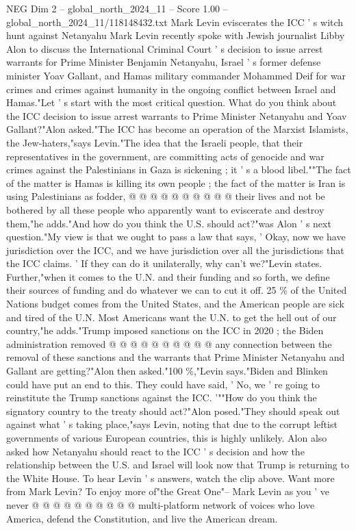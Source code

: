 \begin{textsample}{NEG Dim 2 – global\_north\_2024\_11 – Score 1.00 – global\_north\_2024\_11/118148432.txt}  \label{ex:f2_neg_095}
Mark Levin eviscerates the ICC ' s witch hunt against Netanyahu Mark Levin recently spoke with Jewish journalist Libby Alon to discuss the International Criminal Court ' s decision to issue arrest warrants for Prime Minister Benjamin Netanyahu, Israel ' s former defense minister Yoav Gallant, and Hamas military commander Mohammed Deif for war crimes and crimes against humanity in the ongoing conflict between Israel and Hamas."Let ' s start with the most critical question.
What do you think about the ICC decision to issue arrest warrants to Prime Minister Netanyahu and Yoav Gallant?"Alon asked."The ICC has become an operation of the Marxist Islamists, the Jew-haters,"says Levin."The idea that the Israeli people, that their representatives in the government, are committing acts of genocide and war crimes against the Palestinians in Gaza is sickening ; it ' s a blood libel.""The fact of the matter is Hamas is killing its own people ; the fact of the matter is Iran is using Palestinians as fodder, @ @ @ @ @ @ @ @ @ @ their lives and not be bothered by all these people who apparently want to eviscerate and destroy them,"he adds."And how do you think the U.S. should act?"was Alon ' s next question."My view is that we ought to pass a law that says, ' Okay, now we have jurisdiction over the ICC, and we have jurisdiction over all the jurisdictions that the ICC claims. ' If they can do it unilaterally, why can't we?"Levin states.
Further,"when it comes to the U.N. and their funding and so forth, we define their sources of funding and do whatever we can to cut it off. 25 \% of the United Nations budget comes from the United States, and the American people are sick and tired of the U.N.
Most Americans want the U.N. to get the hell out of our country,"he adds."Trump imposed sanctions on the ICC in 2020 ; the Biden administration removed @ @ @ @ @ @ @ @ @ @ any connection between the removal of these sanctions and the warrants that Prime Minister Netanyahu and Gallant are getting?"Alon then asked."100 \%,"Levin says."Biden and Blinken could have put an end to this.
They could have said, ' No, we ' re going to reinstitute the Trump sanctions against the ICC. '""How do you think the signatory country to the treaty should act?"Alon posed."They should speak out against what ' s taking place,"says Levin, noting that due to the corrupt leftist governments of various European countries, this is highly unlikely.
Alon also asked how Netanyahu should react to the ICC ' s decision and how the relationship between the U.S. and Israel will look now that Trump is returning to the White House.
To hear Levin ' s answers, watch the clip above.
Want more from Mark Levin?
To enjoy more of"the Great One"-- Mark Levin as you ' ve never @ @ @ @ @ @ @ @ @ @ multi-platform network of voices who love America, defend the Constitution, and live the American dream.

\end{textsample}
